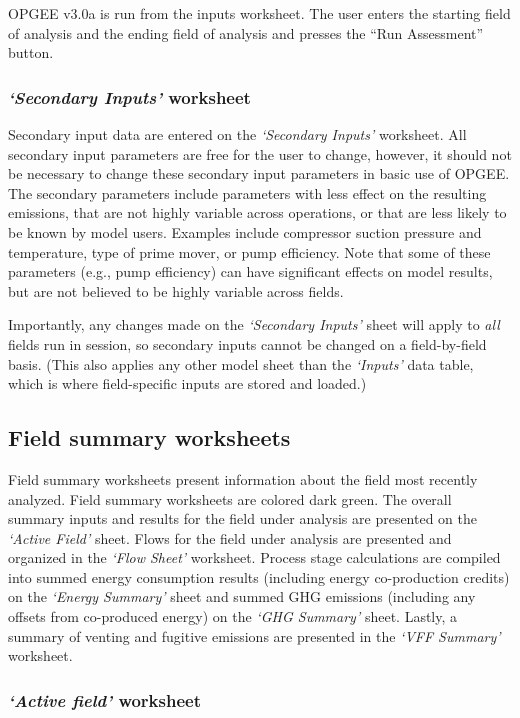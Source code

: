 \documentclass[11pt]{report}
\newcommand{\sheet}[1]{\textit{`{#1}'}}
\begin{document}
OPGEE v3.0a is run from the inputs worksheet. The user enters the starting field of analysis and the ending field of analysis and presses the ``Run Assessment'' button.

\subsubsection{\sheet{Secondary Inputs} worksheet} 

Secondary input data are entered on the \sheet{Secondary Inputs} worksheet. All secondary input parameters are free for the user to change, however, it should not be necessary to change these secondary input parameters in basic use of OPGEE. The secondary parameters include parameters with less effect on the resulting emissions, that are not highly variable across operations, or that are less likely to be known by model users. Examples include compressor suction pressure and temperature, type of prime mover, or pump efficiency. Note that some of these parameters (e.g., pump efficiency) can have significant effects on model results, but are not believed to be highly variable across fields.

Importantly, any changes made on the \sheet{Secondary Inputs} sheet will apply to \emph{all} fields run in session, so secondary inputs cannot be changed on a field-by-field basis. (This also applies any other model sheet than the \sheet{Inputs} data table, which is where field-specific inputs are stored and loaded.) 

\subsection{Field summary worksheets} 

Field summary worksheets present information about the field most recently analyzed. Field summary worksheets are colored dark green. The overall summary inputs and results for the field under analysis are presented on the \sheet{Active Field} sheet. Flows for the field under analysis are presented and organized in the \sheet{Flow Sheet} worksheet. Process stage calculations are compiled into summed energy consumption results (including energy co-production credits) on the \sheet{Energy Summary} sheet and summed GHG emissions (including any offsets from co-produced energy) on the \sheet{GHG Summary} sheet. Lastly, a summary of venting and fugitive emissions are presented in the \sheet{VFF Summary} worksheet.

\subsubsection{\sheet{Active field} worksheet}
\end{document}
